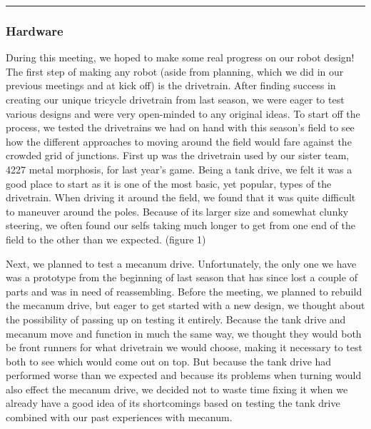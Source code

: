 \noindent\hfil\rule{\textwidth}{.4pt}\hfil


\subsubsection*{Hardware}
During this meeting, we hoped to make some real progress on our robot design! The first step of making any robot (aside from planning, which we did in our previous meetings and at kick off) is the drivetrain. After finding success in creating our unique tricycle drivetrain from last season, we were eager to test various designs and were very open-minded to any original ideas. 
To start off the process, we tested the drivetrains we had on hand with this season's field to see how the different approaches to moving around the field would fare against the crowded grid of junctions. First up was the drivetrain used by our sister team, 4227 metal morphosis, for last year's game. Being a tank drive, we felt it was a good place to start as it is one of the most basic, yet popular, types of the drivetrain. When driving it around the field, we found that it was quite difficult to maneuver around the poles. Because of its larger size and somewhat clunky steering, we often found our selfs taking much longer to get from one end of the field to the other than we expected. (figure 1)

Next, we planned to test a mecanum drive. Unfortunately, the only one we have was a prototype from the beginning of last season that has since lost a couple of parts and was in need of reassembling. Before the meeting, we planned to rebuild the mecanum drive, but eager to get started with a new design, we thought about the possibility of passing up on testing it entirely. Because the tank drive and mecanum move and function in much the same way, we thought they would both be front runners for what drivetrain we would choose, making it necessary to test both to see which would come out on top. But because the tank drive had performed worse than we expected and because its problems when turning would also effect the mecanum drive, we decided not to waste time fixing it when we already have a good idea of its shortcomings based on testing the tank drive combined with our past experiences with mecanum.

